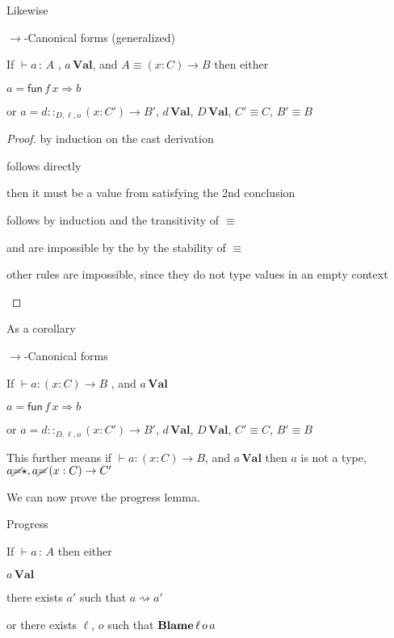 Likewise
\begin{lem}
$\rightarrow$-Canonical forms (generalized)
 
If $\vdash a\,:\,A$ , $a\,\textbf{Val}$, and $A\equiv\left(x:C\right)\rightarrow B$
then either
 
$a=\mathsf{fun}\,f\,x\Rightarrow b$
 
or $a=d::_{D,\ell ,o}\left(x:C'\right)\rightarrow B'$, $d\,\textbf{Val}$, $D\,\textbf{Val}$, $C'\equiv C$, $B'\equiv B$
\end{lem}
 
 
\begin{proof}
by induction on the cast derivation
 
\begin{casenv}
 \item {} follows directly
 \item {} then it must be a value from  satisfying the 2nd conclusion
 \item {} follows by induction and the transitivity of $\equiv$
 
 \item {} and  are impossible by the by the stability of $\equiv$
 \item other rules are impossible, since they do not type values in an empty context
\end{casenv}
\end{proof}
As a corollary
\begin{cor}
$\rightarrow$-Canonical forms
 
If $\vdash a:\left(x:C\right)\rightarrow B$ , and $a\,\textbf{Val}$
 
$a=\mathsf{fun}\,f\,x\Rightarrow b$
 
or $a=d::_{D,\ell ,o}\left(x:C'\right)\rightarrow B'$, $d\,\textbf{Val}$, $D\,\textbf{Val}$, $C'\equiv C$, $B'\equiv B$
\end{cor}
 
This further means if $\vdash a:\left(x:C\right)\rightarrow B$, and $a\,\textbf{Val}$ then $a$ is not a type, $a\cancel{=}\star,a\cancel{=}\left(x:C\right)\rightarrow C'$
 
We can now prove the progress lemma.
 
\begin{thm}
Progress
 
If $\vdash a\,:\,A$ then either
 
$a\,\textbf{Val}$
 
there exists $a'$ such that $a\rightsquigarrow a'$
 
or there exists $\ell$, $o$ such that $\textbf{Blame} \,\ell \,o\,a$
\end{thm}
 
